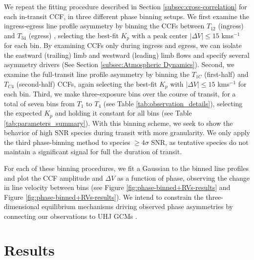 \documentclass[twocolumn]{aastex631}
\begin{document}
            We repeat the fitting procedure described in Section \ref{subsec:cross-correlation} for each in-transit CCF, in three different phase binning setups. We first examine the ingress-egress line profile asymmetry by binning the CCFs between $T_{12}$ (ingress) and $T_{34}$ (egress) \citep{Lund2017}, selecting the best-fit $K_p$ with a peak center $|\Delta V| \leq 15$ kms$^{-1}$ for each bin. By examining CCFs only during ingress and egress, we can isolate the eastward (trailing) limb and westward (leading) limb flows and specify several asymmetry drivers (See Section \ref{subsec:Atmospheric Dynamics}). Second, we examine the full-transit line profile asymmetry by binning the $T_{1C}$ (first-half) and $T_{C4}$ (second-half) CCFs, again selecting the best-fit $K_p$ with $|\Delta V| \leq 15$ kms$^{-1}$ for each bin. Third, we make three-exposure bins over the course of transit, for a total of seven bins from $T_1$ to $T_4$ (see Table \ref{tab:observation_details}), selecting the expected $K_p$ and holding it constant for all bins (see Table \ref{tab:parameters_summary}). With this binning scheme, we seek to show the behavior of high SNR species during transit with more granularity. We only apply the third phase-binning method to species $\geq4\sigma$ SNR, as tentative species do not maintain a significant signal for full the duration of transit.
            
            For each of these binning procedures, we fit a Gaussian to the binned line profiles and plot the CCF amplitude and $\Delta V$ as a function of phase, observing the change in line velocity between bins (see Figure \ref{fig:phase-binned+RVs-results} and Figure \ref{fig:phase-binned+RVs-results}). We intend to constrain the three-dimensional equilibrium mechanisms driving observed phase asymmetries by connecting our observations to UHJ GCMs \citep{Savel2023}. 
            
            
            
    \section{Results}\label{sec:Results}
\end{document}
